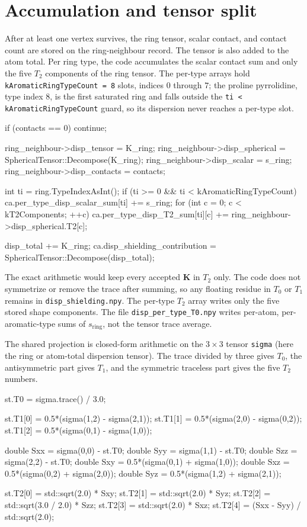 \documentclass[11pt]{article}
\newcommand{\code}[1]{\texttt{#1}}
\begin{document}
\section{Accumulation and tensor split}

After at least one vertex survives, the ring tensor, scalar contact, and
contact count are stored on the ring-neighbour record. The tensor is also added
to the atom total. Per ring type, the code accumulates the scalar contact sum
and only the five \(T_2\) components of the ring tensor. The per-type arrays
hold \code{kAromaticRingTypeCount = 8} slots, indices \(0\) through \(7\); the
proline pyrrolidine, type index \(8\), is the first saturated ring and falls
outside the \code{ti < kAromaticRingTypeCount} guard, so its dispersion never
reaches a per-type slot.

\begin{codebox}
if (contacts == 0) continue;

ring_neighbour->disp_tensor = K_ring;
ring_neighbour->disp_spherical = SphericalTensor::Decompose(K_ring);
ring_neighbour->disp_scalar = s_ring;
ring_neighbour->disp_contacts = contacts;

int ti = ring.TypeIndexAsInt();
if (ti >= 0 && ti < kAromaticRingTypeCount) {
    ca.per_type_disp_scalar_sum[ti] += s_ring;
    for (int c = 0; c < kT2Components; ++c)
        ca.per_type_disp_T2_sum[ti][c] += ring_neighbour->disp_spherical.T2[c];
}

disp_total += K_ring;
ca.disp_shielding_contribution =
    SphericalTensor::Decompose(disp_total);
\end{codebox}

The exact arithmetic would keep every accepted \(\bm K\) in \(T_2\) only. The
code does not symmetrize or remove the trace after summing, so any floating
residue in \(T_0\) or \(T_1\) remains in \code{disp\_shielding.npy}. The
per-type \(T_2\) array writes only the five stored shape components. The file
\code{disp\_per\_type\_T0.npy} writes per-atom, per-aromatic-type sums of
\(s_{\mathrm{ring}}\), not the tensor trace average.

The shared projection is closed-form arithmetic on the \(3\times3\) tensor
\code{sigma} (here the ring or atom-total dispersion tensor). The trace divided
by three gives \(T_0\), the antisymmetric part gives \(T_1\), and the symmetric
traceless part gives the five \(T_2\) numbers.

\begin{codebox}
st.T0 = sigma.trace() / 3.0;

st.T1[0] = 0.5*(sigma(1,2) - sigma(2,1));
st.T1[1] = 0.5*(sigma(2,0) - sigma(0,2));
st.T1[2] = 0.5*(sigma(0,1) - sigma(1,0));

double Sxx = sigma(0,0) - st.T0;
double Syy = sigma(1,1) - st.T0;
double Szz = sigma(2,2) - st.T0;
double Sxy = 0.5*(sigma(0,1) + sigma(1,0));
double Sxz = 0.5*(sigma(0,2) + sigma(2,0));
double Syz = 0.5*(sigma(1,2) + sigma(2,1));

st.T2[0] = std::sqrt(2.0) * Sxy;
st.T2[1] = std::sqrt(2.0) * Syz;
st.T2[2] = std::sqrt(3.0 / 2.0) * Szz;
st.T2[3] = std::sqrt(2.0) * Sxz;
st.T2[4] = (Sxx - Syy) / std::sqrt(2.0);
\end{codebox}
\end{document}
